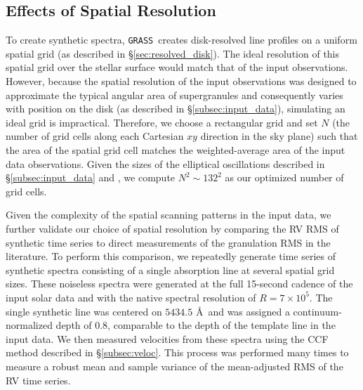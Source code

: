 \documentclass[twocolumn]{aastex63}
\newcommand{\grass}{\texttt{GRASS}}
\newcommand{\revise}[1]{#1}
\begin{document}
\subsection{Effects of Spatial Resolution} \label{subsec:res}

\revise{To create synthetic spectra, \grass\ creates disk-resolved line profiles on a uniform spatial grid (as described in \S\ref{sec:resolved_disk}).} The \revise{ideal resolution of this spatial grid over the stellar surface would match that of the input observations. However, because the spatial resolution of the input observations was designed to approximate the typical angular area of supergranules and consequently varies with position on the disk (as described in \S\ref{subsec:input_data}), simulating an ideal grid is impractical.} Therefore, we choose \revise{a rectangular grid and set} $N$ \revise{(the number of grid cells along each Cartesian $xy$ direction in the sky plane) such that the area of the spatial grid cell matches the weighted-average area of the input data observations. Given the sizes of the elliptical oscillations described in \S\ref{subsec:input_data} and \citetalias{Lohner-Bottcher2018}, we compute $N^2\sim132^2$ as our optimized number of grid cells.} \par

\revise{Given the complexity of the spatial scanning patterns in the input data, we further validate our choice of spatial resolution by comparing the RV RMS of synthetic time series to direct measurements of the granulation RMS in the literature.} \revise{To perform this comparison,} we repeatedly generate time series of synthetic spectra consisting of a single absorption line at several spatial grid sizes. These noiseless spectra were generated at the full 15-second cadence of the input solar data and with the native spectral resolution of $R=7 \times 10^5$. The single synthetic line was centered on $5434.5$ \AA\ and was assigned a continuum-normalized depth of 0.8, comparable to the depth of the template line in the input data. We then measured velocities from these spectra using the CCF method described in \S\ref{subsec:veloc}. This process was performed many times to measure a robust mean and sample variance of the mean-adjusted RMS of the RV time series. \par
\end{document}
